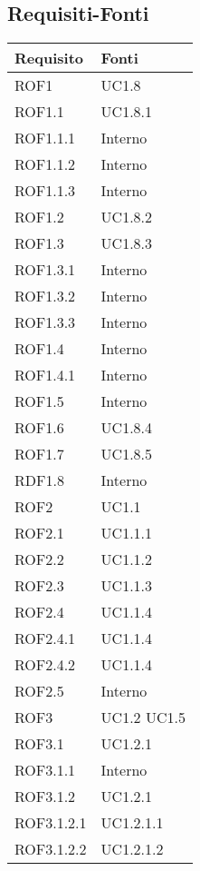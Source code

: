 \subsection{Requisiti-Fonti} %
\label{ssub:requisiti_fonti}
\begin{center}
\def\arraystretch{1.5}
\bgroup
\begin{longtable}{| p{4cm} | p{4cm} |}
\hline
\textbf{Requisito} & \textbf{Fonti} \\
\hline
ROF1   &  UC1.8 \\
\hline
ROF1.1   &  UC1.8.1 \\
\hline
ROF1.1.1   &  Interno \\
\hline
ROF1.1.2   &  Interno \\
\hline
ROF1.1.3   &  Interno \\
\hline
ROF1.2   &  UC1.8.2 \\
\hline
ROF1.3   &  UC1.8.3 \\
\hline
ROF1.3.1   &  Interno \\
\hline
ROF1.3.2   &  Interno \\
\hline
ROF1.3.3   &  Interno \\
\hline
ROF1.4   &  Interno \\
\hline
ROF1.4.1   &  Interno \\
\hline
ROF1.5   &  Interno \\
\hline
ROF1.6   &  UC1.8.4 \\
\hline
ROF1.7   &  UC1.8.5 \\
\hline
RDF1.8   &  Interno \\
\hline
ROF2   &  UC1.1 \\
\hline
ROF2.1   &  UC1.1.1 \\
\hline
ROF2.2   &  UC1.1.2 \\
\hline
ROF2.3   &  UC1.1.3 \\
\hline
ROF2.4   &  UC1.1.4 \\
\hline
ROF2.4.1   &  UC1.1.4 \\
\hline
ROF2.4.2   &  UC1.1.4 \\
\hline
ROF2.5   &  Interno  \\
\hline
ROF3   &  UC1.2 \newline UC1.5 \\
\hline
ROF3.1   &  UC1.2.1 \\
\hline
ROF3.1.1   &  Interno \\
\hline
ROF3.1.2   &  UC1.2.1 \\
\hline
ROF3.1.2.1   &  UC1.2.1.1 \\
\hline
ROF3.1.2.2   &  UC1.2.1.2 \\

\end{longtable}
\end{center}
